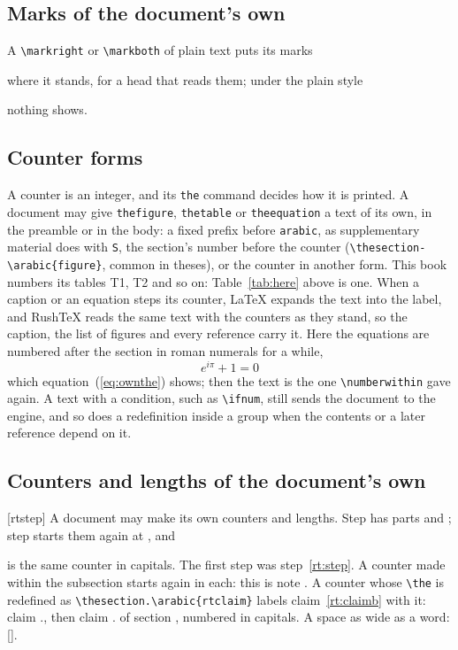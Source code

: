 \documentclass{article}
\numberwithin{equation}{section}
\theoremstyle{definition}
\theoremstyle{remark}
\newcounter{rtcue}[subsection]
\newcounter{rtclaim}[section]
\renewcommand{\thertclaim}{\thesection.\arabic{rtclaim}}
\begin{document}
\subsection{Marks of the document's own}\label{sec:ownmarks}
A \verb|\markright| or \verb|\markboth| of plain text puts its marks
where it stands, for a head that reads them; under the plain style
nothing shows.

\subsection{Counter forms}
A counter is an integer, and its \texttt{the} command decides how it is printed.
A document may give \texttt{thefigure}, \texttt{thetable} or \texttt{theequation} a text
of its own, in the preamble or in the body: a fixed prefix before \texttt{arabic}, as
supplementary material does with \texttt{S}, the section's number before the counter
(\verb|\thesection-\arabic{figure}|, common in theses), or the counter in another form. This
book numbers its tables T1, T2 and so on: Table~\ref{tab:here} above is one. When a caption
or an equation steps its counter, \LaTeX{} expands the text into the label, and RushTeX
reads the same text with the counters as they stand, so the caption, the list of figures
and every reference carry it. Here the equations are numbered after the section in roman
numerals for a while,
\renewcommand{\theequation}{\thesection-\roman{equation}}%
\begin{equation}\label{eq:ownthe}
e^{i\pi}+1=0
\end{equation}%
\renewcommand{\theequation}{\thesection.\arabic{equation}}%
which equation~(\ref{eq:ownthe}) shows; then the text is the one \verb|\numberwithin| gave
again. A text with a condition, such as \verb|\ifnum|, still sends the document to the
engine, and so does a redefinition inside a group when the contents or a later reference
depend on it.

\subsection{Counters and lengths of the document's own}\label{sec:owncounters}
[rtstep]\newlength{\rtgap}
A document may make its own counters and lengths. Step \label{rt:step}\thertstep{}
has parts  and ; step
 starts them again at , and
\addtocounter{rtstep}{1997} is the same counter in capitals. The first step
was step~\ref{rt:step}. A counter made within the subsection starts again in each: this
is note . A counter whose \verb|\the| is redefined
as \verb|\thesection.\arabic{rtclaim}| labels claim~\ref{rt:claimb} with it: claim
\thertclaim, then claim \label{rt:claimb}\thertclaim{}
of section \thesection, numbered  in capitals.
\settowidth{\rtgap}{Hello}\noindent A space as wide as a word: [\hspace{\rtgap}].
\end{document}
